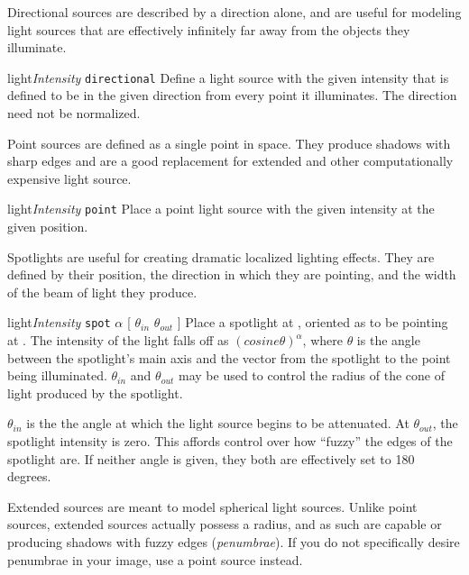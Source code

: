 Directional sources are described by a direction alone, and are useful
for modeling light sources that are effectively infinitely far away
from the objects they illuminate.   

\begin{defkey}{light}{{\em Intensity\/} {\tt directional} }
	Define a light source with the given intensity that is
	defined to be in the given direction from every point
	it illuminates.  The direction need not be normalized.
\end{defkey}

Point sources are defined as a single point in space.  They produce
shadows with sharp edges and are a good replacement for extended
and other computationally expensive light source.

\begin{defkey}{light}{{\em Intensity\/} {\tt point} }
	Place a point light source with the given intensity at the
	given position.
\end{defkey}

Spotlights are useful for creating dramatic localized lighting effects.
They are defined by their position, the direction in which they
are pointing, and the width of the beam of light they produce.

\begin{defkey}{light}{{\em Intensity\/} {\tt spot}  
    {$\alpha$} [ $\theta_{in}$ $\theta_{out}$ ]}
	Place a spotlight at , oriented as to be pointing at
	.  The intensity of the light falls off as
	$(cosine \theta)^{\alpha}$, where $\theta$ is the angle between the
	spotlight's main axis and the vector from the spotlight to the
	point being illuminated.  $\theta_{in}$ and
	$\theta_{out}$ may be used to control the radius of the cone of light
	produced by the spotlight.
\end{defkey}
$\theta_{in}$ is the the angle at which
the light source begins to be attenuated.  At $\theta_{out}$,
the spotlight intensity is zero.
This affords control
over how ``fuzzy'' the edges of the spotlight are.  If neither angle
is given, they both are effectively set to 180 degrees.

Extended sources are meant to model spherical light sources.  Unlike
point sources, extended sources actually possess a radius, and as such
are capable or producing shadows with fuzzy edges ({\em penumbrae}).  If
you do not specifically desire penumbrae in your image, use a point
source instead.

